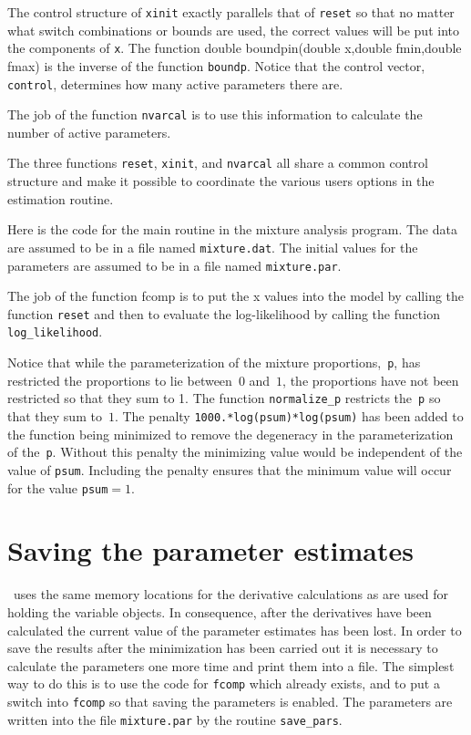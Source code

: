 \documentclass[12pt]{book}
\begin{document}
\bigbreak
{}

The control structure of {\tt xinit} exactly parallels that of {\tt reset}
so that no matter what switch combinations or bounds are used, the
correct values will be put into the components of {\tt x}.
The function
\beginexample
double boundpin(double x,double fmin,double fmax)
\endexample
\noindent is the inverse of the function {\tt boundp}.
Notice that the control vector, {\tt control}, determines how many 
active parameters there are. 

The job of the function
{\tt nvarcal} is to use this information to calculate the number
of active parameters.
\bigbreak
{}

The three functions {\tt reset}, {\tt xinit}, and {\tt nvarcal}
all share a common control structure and make it possible to
coordinate the various users options in the estimation routine.

Here is the code for the main routine in the mixture analysis 
program. The data are assumed to be in a file named {\tt mixture.dat}.
The initial values for the parameters are assumed to be in a file
named {\tt mixture.par}.
\bigbreak
{}

The job of the function fcomp is to put the x values into the model
by calling the function {\tt reset} and then to evaluate the log-likelihood
by calling the function {\tt log\_likelihood}.
\bigbreak
{}

Notice that while the parameterization of the mixture proportions,~{\tt p},
has restricted the proportions to lie between~$0$ and~$1$, the
proportions have not been restricted so that they sum to 1. 
The function {\tt normalize\_p} restricts the~{\tt p} so that they sum 
to~$1$. 
\bigbreak
{}
\noindent The penalty {\tt 1000.*log(psum)*log(psum)} has been added to the
function being minimized to remove the degeneracy in the parameterization of
the~{\tt p}. Without this penalty the minimizing value 
would be independent of the value of {\tt psum}. Including
the penalty ensures that the minimum value will occur for the value
{\tt psum}$=1$.
\section{Saving the parameter estimates}
\AD\ uses the same memory locations for the derivative
calculations as are used for holding the variable objects.
In consequence, after the derivatives have been calculated
the current value of the parameter estimates has been lost.
In order to save the results after the minimization has
been carried out it is necessary to calculate the
parameters one more time and print them into a file.
The simplest way to do this is to use the code for
{\tt fcomp} which already exists, and to put a
switch into {\tt fcomp} so that saving the parameters is enabled.
The parameters are written into the file {\tt mixture.par} by the
routine {\tt save\_pars}.
\bigbreak
{}
\endchapter
\end{document}
